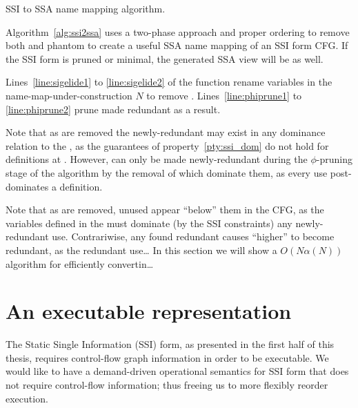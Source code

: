 \documentclass[12pt,titlepage,twoside]{article}
\let\oldsection\section
\renewcommand{\section}{\setcounter{figure}{0}\setcounter{table}{0}\oldsection}
\begin{document}
{\begin{myalgorithm}\small

\caption{SSI to SSA name mapping algorithm.}
\label{alg:ssi2ssa}
\end{myalgorithm}
Algorithm~\ref{alg:ssi2ssa} uses a two-phase approach and proper
ordering to remove both  and phantom  to
create a useful SSA name mapping of an SSI form CFG.  If the SSI form
is pruned or minimal, the generated SSA view will be as well.

Lines~\ref{line:sigelide1} to \ref{line:sigelide2} of the
 function rename variables in the
name-map-under-construction $N$ to remove .
Lines~\ref{line:phiprune1} to \ref{line:phiprune2} prune
 made redundant as a result.

Note that as  are removed the newly-redundant
 may exist in any dominance relation to the
\sigfunction{}, as the guarantees of property~\ref{pty:ssi_dom} do not
hold for definitions at .  However,  can
only be made newly-redundant during the $\phi$-pruning stage of the
algorithm by the removal of  which dominate them, as
every use post-dominates a \phifunction{} definition.

Note that as  are removed, unused 
appear ``below'' them in the CFG, as the variables defined in the
\sigfunction{} must dominate (by the SSI constraints) any
newly-redundant use.  Contrariwise, any  found
redundant causes ``higher''  to become redundant, as
the redundant use\ldots
%
In this section we will show a $O(N\alpha(N))$ algorithm for
efficiently convertin\ldots %
} %

\section{An executable representation}\label{sec:ssiplus}
The Static Single Information (SSI) form, as presented in the first
half of this thesis,
requires control-flow graph information in order to be executable. We
would like to have a demand-driven operational semantics for SSI form
that does not require control-flow information; thus freeing us to
more flexibly reorder execution.
\end{document}
